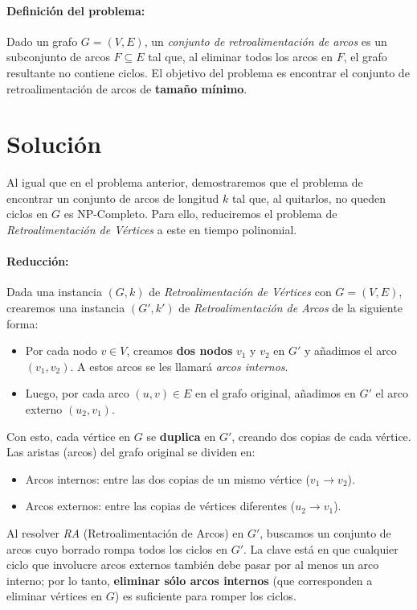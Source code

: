 \documentclass[12pt]{article}
\begin{document}
\paragraph{Definición del problema:}
Dado un grafo $G = (V, E)$, un \textit{conjunto de retroalimentación de arcos} es un 
subconjunto de arcos $F \subseteq E$ tal que, al eliminar todos los arcos en $F$, 
el grafo resultante no contiene ciclos. El objetivo del problema es encontrar el conjunto 
de retroalimentación de arcos de \textbf{tamaño mínimo}.

\section*{Solución}
Al igual que en el problema anterior, demostraremos que el problema de encontrar un 
conjunto de arcos de longitud $k$ tal que, al quitarlos, no queden ciclos en $G$ es 
NP-Completo. Para ello, reduciremos el problema de \textit{Retroalimentación de 
Vértices} a este en tiempo polinomial.

\paragraph{Reducción:}
Dada una instancia $(G, k)$ de \textit{Retroalimentación de Vértices} con $G = (V, E)$, 
crearemos una instancia $(G', k')$ de \textit{Retroalimentación de Arcos} de la siguiente forma:

\begin{itemize}
  \item Por cada nodo $v \in V$, creamos \textbf{dos nodos} $v_1$ y $v_2$ en $G'$ y 
  añadimos el arco $(v_1, v_2)$. A estos arcos se les llamará \emph{arcos internos}.
  
  \item Luego, por cada arco $(u, v) \in E$ en el grafo original, añadimos en $G'$ 
  el arco externo $(u_2, v_1)$. 
\end{itemize}

Con esto, cada vértice en $G$ se \textbf{duplica} en $G'$, creando dos copias de cada vértice. 
Las aristas (arcos) del grafo original se dividen en:
\begin{itemize}
  \item Arcos internos: entre las dos copias de un mismo vértice ($v_1 \to v_2$).
  \item Arcos externos: entre las copias de vértices diferentes ($u_2 \to v_1$).
\end{itemize}

Al resolver \textit{RA} (Retroalimentación de Arcos) en $G'$, buscamos un conjunto de 
arcos cuyo borrado rompa todos los ciclos en $G'$. La clave está en que cualquier ciclo 
que involucre arcos externos también debe pasar por al menos un arco interno; por lo tanto, 
\textbf{eliminar sólo arcos internos} (que corresponden a eliminar vértices en $G$) es suficiente 
para romper los ciclos.
\end{document}
